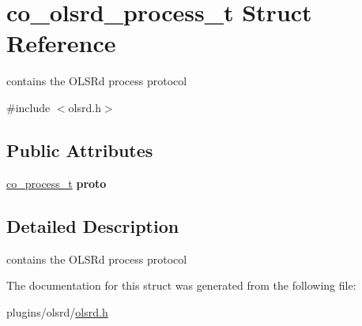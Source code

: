 \hypertarget{structco__olsrd__process__t}{\section{co\+\_\+olsrd\+\_\+process\+\_\+t Struct Reference}
\label{structco__olsrd__process__t}
}


contains the O\+L\+S\+Rd process protocol  




{\ttfamily \#include $<$olsrd.\+h$>$}

\subsection*{Public Attributes}
\begin{DoxyCompactItemize}
\item 
\hypertarget{structco__olsrd__process__t_a598b23519e15a67bf9b861bf19dd38d6}{\hyperlink{structco__process__t}{co\+\_\+process\+\_\+t} {\bfseries proto}}\label{structco__olsrd__process__t_a598b23519e15a67bf9b861bf19dd38d6}

\end{DoxyCompactItemize}


\subsection{Detailed Description}
contains the O\+L\+S\+Rd process protocol 

The documentation for this struct was generated from the following file\+:\begin{DoxyCompactItemize}
\item 
plugins/olsrd/\hyperlink{olsrd_8h}{olsrd.\+h}\end{DoxyCompactItemize}
